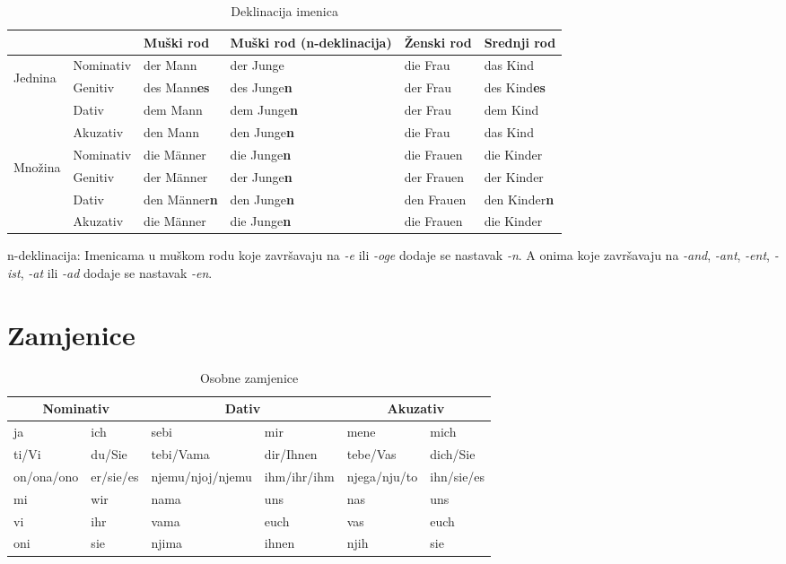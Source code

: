 \documentclass[12pt,german]{article}
\newcommand{\nastavak}[1]{\emph{-#1}}
\begin{document}
\begin{multicols}{2}
\begin{table*}[htb]
\caption{Deklinacija imenica}
\begin{tabular}{llllll}
\toprule
  &  & Muški rod & Muški rod (n-deklinacija) & Ženski rod & Srednji rod \\
\midrule
\multirow{4}{3mm}{\begin{sideways}\parbox{15mm}{Jednina}\end{sideways}}
& Nominativ & der Mann & der Junge & die Frau & das Kind \\
& Genitiv & des Mann\bf{es} & des Junge\bf{n} & der Frau & des Kind\bf{es} \\
& Dativ & dem Mann & dem Junge\bf{n} & der Frau & dem Kind \\
& Akuzativ & den Mann & den Junge\bf{n} & die Frau & das Kind \\
\midrule
\multirow{4}{3mm}{\begin{sideways}\parbox{15mm}{Množina}\end{sideways}}
& Nominativ & die M\"anner & die Junge\bf{n} & die Frauen & die Kinder \\
& Genitiv & der M\"anner & der Junge\bf{n} & der Frauen & der Kinder \\
& Dativ & den M\"anner\bf{n} & den Junge\bf{n} & den Frauen & den Kinder\bf{n} \\
& Akuzativ & die M\"anner & die Junge\bf{n} & die Frauen & die Kinder \\
\bottomrule
\end{tabular}
\begin{tablenotes}
  \small
  n-deklinacija: Imenicama u muškom rodu koje završavaju na \nastavak{e} ili
  \nastavak{oge} dodaje se nastavak \nastavak{n}. A onima koje završavaju na
  \nastavak{and}, \nastavak{ant}, \nastavak{ent}, \nastavak{ist}, \nastavak{at}
  ili \nastavak{ad} dodaje se nastavak \nastavak{en}.
\end{tablenotes}
\end{table*}

\section{Zamjenice}
\begin{table*}[htb]
\caption{Osobne zamjenice}
\begin{tabular}{ll|ll|ll}
\toprule
  \multicolumn{2}{c}{Nominativ} & \multicolumn{2}{c}{Dativ} & \multicolumn{2}{c}{Akuzativ} \\
\midrule
  ja & ich & sebi & mir & mene & mich \\
  ti/Vi & du/Sie & tebi/Vama & dir/Ihnen & tebe/Vas & dich/Sie \\
  on/ona/ono & er/sie/es & njemu/njoj/njemu & ihm/ihr/ihm & njega/nju/to & ihn/sie/es \\
  mi & wir & nama & uns & nas & uns \\
  vi & ihr & vama & euch & vas & euch \\
  oni & sie & njima & ihnen & njih & sie \\
\bottomrule
\end{tabular}
\end{table*}


\end{multicols}
\end{document}
